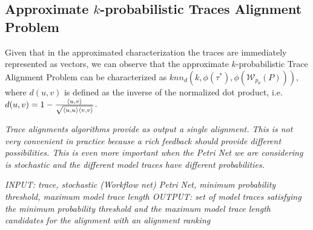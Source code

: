 \subsection{Approximate $k$-probabilistic Traces Alignment Problem}\label{subsec:akptap}
Given that in the approximated characterization the traces are immediately represented as vectors, we can observe that the approximate $k$-probabilistic Trace Alignment Problem can be characterized as $knn_d(k,\phi(\tau^*),\phi(\mathcal{W}_{p_\theta}(P)))$, where $d(u,v)$ is defined as the inverse of the normalized dot product, i.e. $d(u,v)=1-\frac{\braket{u,v}}{\sqrt{\braket{u,u}\braket{v,v}}}$. 



\textit{Trace alignments algorithms provide as output a single alignment. This is not very convenient in practice because a rich feedback should provide different possibilities. This is even more important when the Petri Net we are considering is stochastic and the different model traces have different probabilities.}

\textit{INPUT: trace, stochastic (Workflow net) Petri Net, minimum probability threshold, maximum model trace length
OUTPUT: set of model traces satisfying the minimum probability threshold and the maximum model trace length candidates for the alignment with an alignment ranking}
